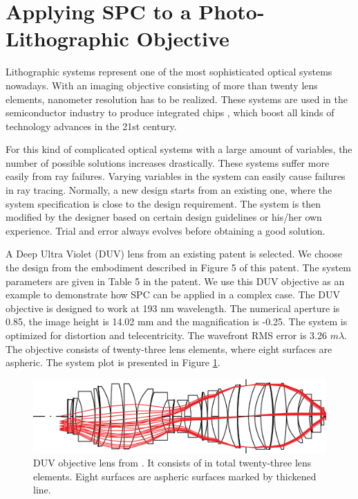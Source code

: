 \newpage
\section{Applying SPC to a Photo-Lithographic Objective}
Lithographic systems represent one of the most sophisticated optical systems nowadays. With an imaging objective consisting of more than twenty lens elements, nanometer resolution has to be realized. These systems are used in the semiconductor industry to produce integrated chips \cite{Matsuyama2006_LithoHis}, which boost all kinds of technology advances in the 21st century. 

For this kind of complicated optical systems with a large amount of variables, the number of possible solutions increases drastically. These systems suffer more easily from ray failures. Varying variables in the system can easily cause failures in ray tracing. Normally, a new design starts from an existing one, where the system specification is close to the design requirement. The system is then modified by the designer based on certain design guidelines \cite{LivshitsQA2013}\cite{Shafer1995_moreless}\cite{Cao2017_GroupDesign} or his/her own experience. Trial and error always evolves before obtaining a good solution. 

A Deep Ultra Violet (DUV) lens from an existing patent \cite{patentZeissDUV} is selected. We choose the design from the embodiment described in Figure 5 of this patent. The system parameters are given in Table 5 in the patent. We use this DUV objective as an example to demonstrate how SPC can be applied in a complex case. The DUV objective is designed to work at 193 nm wavelength. The numerical aperture is 0.85, the image height is 14.02 mm and the magnification is -0.25. The system is optimized for distortion and telecentricity. The wavefront RMS error is 3.26 $m\lambda$. The objective consists of twenty-three lens elements, where eight surfaces are aspheric. The system plot is presented in Figure \ref{fig: litho_DUV_plot}. 
\begin{figure}[h!]
    \centering
    \includegraphics[width=\textwidth]{chapter-4/figures/Litho_DUV_plot.png}
    \caption{DUV objective lens from \cite{patentZeissDUV}. It consists of in total twenty-three lens elements. Eight surfaces are aspheric surfaces marked by thickened line.}
    \label{fig: litho_DUV_plot}
\end{figure}

